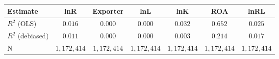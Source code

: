 \begin{tabular}{l*{6}{c}}
\hline\hline
 Estimate & lnR & Exporter & lnL & lnK & ROA & lnRL \\
\hline
\addlinespace $ R^2$ (OLS) & $0.016$ & $0.000$ & $0.000$ & $0.032$ & $0.652$ & $0.025$ \\
$ R^2$ (debiased) & $0.011$ & $0.000$ & $0.000$ & $0.003$ & $0.214$ & $0.017$ \\
N & $1,172,414$ & $1,172,414$ & $1,172,414$ & $1,172,414$ & $1,172,414$ & $1,172,414$ \\
\hline\hline
\end{tabular}

